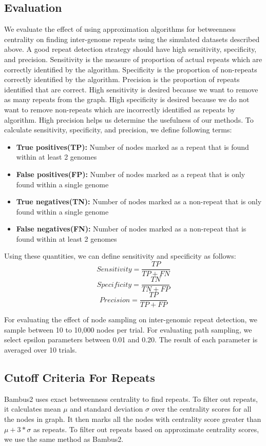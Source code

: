 \documentclass[runningheads,a4paper]{llncs}
\begin{document}
\subsection*{Evaluation}
We evaluate the effect of using approximation algorithms for betweenness centrality on finding inter-genome repeats using the simulated datasets described above.
A good repeat detection strategy should have high sensitivity, specificity, and precision. Sensitivity is the measure of proportion of actual repeats which are correctly identified by the algorithm. Specificity is the proportion of non-repeats correctly identified by the algorithm. Precision is the proportion of repeats identified that are correct. High sensitivity is desired because we want to remove as many repeats from the graph. High specificity is desired because we do not want to remove non-repeats which are incorrectly identified as repeats by algorithm. High precision helps us determine the usefulness of our methods. To calculate sensitivity, specificity, and precision, we define following terms:
\begin{itemize}
\item \textbf{True positives(TP):} Number of nodes marked as a repeat that is found within at least 2 genomes
\item \textbf{False positives(FP):} Number of nodes marked as a repeat that is only found within a single genome
\item \textbf{True negatives(TN):} Number of nodes marked as a non-repeat that is only found within a single genome
\item \textbf{False negatives(FN):} Number of nodes marked as a non-repeat that is found within at least 2 genomes
\end{itemize}

Using these quantities, we can define sensitivity and specificity as follows:
 $$Sensitivity = \frac{TP}{TP+FN}$$
 $$Specificity = \frac{TN}{TN+FP}$$
 $$Precision = \frac{TP}{TP + FP}$$

For evaluating the effect of node sampling on inter-genomic repeat detection, we sample between 10 to 10,000 nodes per trial.
For evaluating path sampling, we select epsilon parameters between 0.01 and 0.20.
The result of each parameter is averaged over 10 trials.


\subsection*{Cutoff Criteria For Repeats}
Bambus2\cite{bambus} uses exact betweenness centrality to find repeats. To filter out repeats, it calculates mean $\mu$ and standard deviation $\sigma$ over the centrality scores for all the nodes in graph. It then marks all the nodes with centrality score greater than $\mu + 3*\sigma$ as repeats. To filter out repeats based on approximate centrality scores, we use the same method as Bambus2. 
\end{document}
